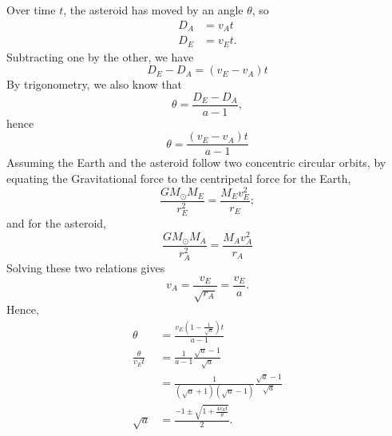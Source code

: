 \documentclass[12pt]{article}
\begin{document}
Over time $t$, the asteroid has moved by an angle $\theta$, so
\begin{align*}
D_{A} &= v_{A}t \\
D_{E} &= v_{E}t.
\end{align*}
Subtracting one by the other, we have
\begin{equation*}
D_{E}-D_{A}=(v_{E}-v_{A})t
\end{equation*}
By trigonometry, we also know that
\begin{equation*}
\theta = \frac{D_{E}-D_{A}}{a-1},
\end{equation*}
hence
\begin{equation*}
\theta = \frac{(v_{E}-v_{A})t}{a-1}
\end{equation*}
Assuming the Earth and the asteroid follow two concentric circular orbits, by equating the Gravitational force to the centripetal force for the Earth,
\begin{equation*}
\frac{GM_{\odot}M_{E}}{r_{E}^{2}} = \frac{M_{E}v_{E}^{2}}{r_{E}};
\end{equation*}
and for the asteroid,
\begin{equation*}
\frac{GM_{\odot}M_{A}}{r_{A}^{2}} = \frac{M_{A}v_{A}^{2}}{r_{A}}
\end{equation*}
Solving these two relations gives
\begin{equation*}
v_{A} = \frac{v_{E}}{\sqrt{r_{A}}} = \frac{v_{E}}{a}.
\end{equation*}
Hence,
\begin{align*}
\theta &= \frac{v_{E}(1-\frac{1}{\sqrt{a}})t}{a-1} \\
\frac{\theta}{v_{E}t} &= \frac{1}{a-1} \frac{\sqrt{a}-1}{\sqrt{a}} \\
&= \frac{1}{(\sqrt{a}+1)(\sqrt{a}-1)} \frac{\sqrt{a}-1}{\sqrt{a}} \\
\sqrt{a} &= \frac{-1\pm \sqrt{1+\frac{4v_{E}t}{\theta}}}{2}.
\end{align*}
\end{document}
